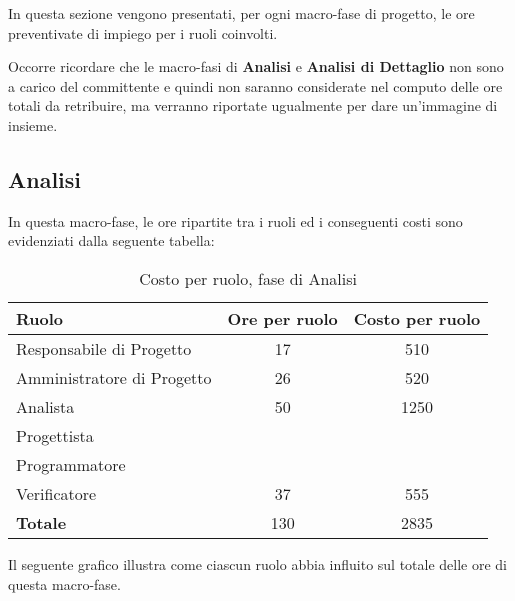 In questa sezione vengono presentati, per ogni macro-fase di progetto, le ore preventivate di impiego per i ruoli coinvolti.

\noindent Occorre ricordare che le macro-fasi di \textbf{Analisi} e \textbf{Analisi di Dettaglio} non sono a carico del committente e quindi non saranno considerate nel computo delle ore totali da retribuire, ma verranno riportate ugualmente per dare un'immagine di insieme.

\subsection{Analisi}
In questa macro-fase, le ore ripartite tra i ruoli ed i conseguenti costi sono evidenziati dalla seguente tabella:

\begin{table}[h]
	\centering
	\begin{tabular}{|l|c|c|}
		\toprule
		\textbf{Ruolo} & \textbf{Ore per ruolo} & \textbf{Costo per ruolo} \\
				
		\midrule
		Responsabile di Progetto & 17 & 510 \\
		Amministratore di Progetto & 26 & 520 \\ 
		Analista & 50 & 1250 \\
		Progettista & & \\
		Programmatore & & \\
		Verificatore & 37 & 555 \\
		\midrule
		\textbf{Totale} & 130 & 2835 \\
				
		\bottomrule
	\end{tabular}
	\caption{Costo per ruolo, fase di Analisi}
\end{table}

\noindent Il seguente grafico illustra come ciascun ruolo abbia influito sul totale delle ore di questa macro-fase.

